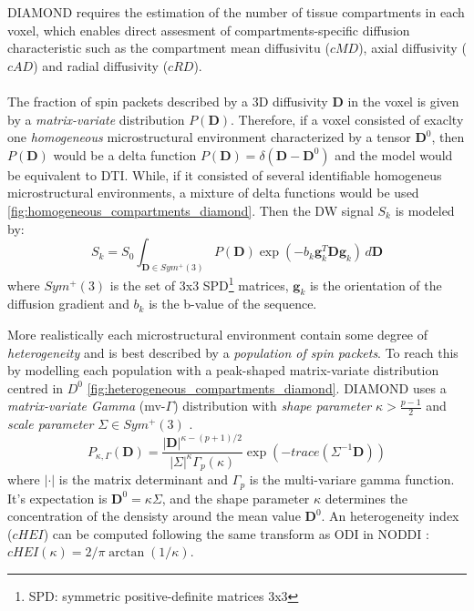  DIAMOND requires the estimation of the number of tissue compartments in each voxel, which enables direct assesment of compartments-specific diffusion characteristic such as the compartment mean diffusivitu ($cMD$), axial diffusivity ($cAD$) and radial diffusivity ($cRD$). 
 \\\\
 The fraction of spin packets described by a 3D diffusivity $\mathbf{D}$ in the voxel is given by a \emph{matrix-variate} distribution $P(\mathbf{D})$. Therefore, if a voxel consisted of exaclty one \emph{homogeneous} microstructural environment characterized by a tensor $\mathbf{D}^0$, then $P(\mathbf{D})$ would be a delta function $P(\mathbf{D})=\delta(\mathbf{D}-\mathbf{D}^0)$ and the model would be equivalent to DTI. While, if it consisted of several identifiable homogeneus microstructural environments, a mixture of delta functions would be used \cite{scherrer2016diamond} \ref{fig:homogeneous_compartments_diamond}. Then the DW signal $S_k$ is modeled by:
 \begin{equation}\label{eq:1.26}
   S_k = S_0 \int_{\mathbf{D}\in Sym^{+}(3)} P(\mathbf{D})\exp(-b_k\mathbf{g}_k^T\mathbf{D}\mathbf{g}_k) \,d\mathbf{D}
 \end{equation}
 where $Sym^{+}(3)$ is the set of 3x3 SPD\footnote{SPD: symmetric positive-definite matrices 3x3} matrices, $\mathbf{g}_k$ is the orientation of the diffusion gradient and $b_k$ is the b-value of the sequence.

 More realistically each microstructural environment contain some degree of \emph{heterogeneity} and is best described by a \emph{population of spin packets}. To reach this by modelling each population with a peak-shaped matrix-variate distribution centred in $D^0$ \ref{fig:heterogeneous_compartments_diamond}. DIAMOND uses a \emph{matrix-variate Gamma} (mv-$\Gamma$) distribution with \emph{shape parameter} $\kappa > \frac{p-1}{2}$ and \emph{scale parameter} $\Sigma \in Sym^{+}(3)$ \cite{scherrer2016diamond}.
 \begin{equation}
   P_{\kappa,\Gamma}(\mathbf{D}) = \frac{|\mathbf{D}|^{\kappa-(p+1)/2}}{|\Sigma|^\kappa \Gamma_p(\kappa)}\exp (-trace(\Sigma^{-1}\mathbf{D}))
 \end{equation}
 where $|\cdot|$ is the matrix determinant and $\Gamma_p$ is the multi-variare gamma function. It's expectation is $\mathbf{D}^0=\kappa\Sigma$, and the shape parameter $\kappa$ determines the concentration of the densisty around the mean value $\mathbf{D}^0$. An heterogeneity index ($cHEI$) can be computed following the same transform as ODI in NODDI \cite{zhang2012noddi}: $cHEI(\kappa) = 2/\pi \arctan (1/\kappa)$.

